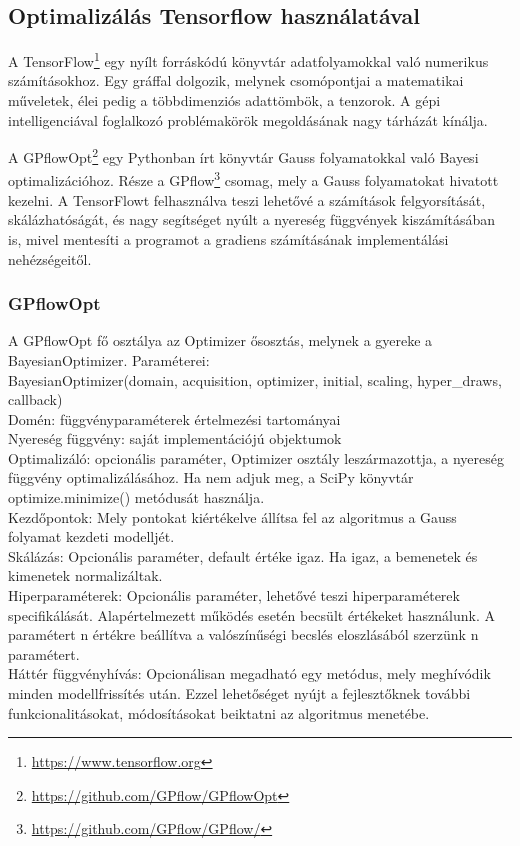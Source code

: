 \subsection{Optimalizálás Tensorflow használatával}
A TensorFlow\footnote{\url{https://www.tensorflow.org}} egy nyílt forráskódú könyvtár adatfolyamokkal való numerikus számításokhoz. Egy gráffal dolgozik, melynek csomópontjai a matematikai műveletek, élei pedig a többdimenziós adattömbök, a tenzorok. A gépi intelligenciával foglalkozó problémakörök megoldásának nagy tárházát kínálja.

A GPflowOpt\footnote{\url{https://github.com/GPflow/GPflowOpt}} egy Pythonban írt könyvtár Gauss folyamatokkal való Bayesi optimalizációhoz. Része a GPflow\footnote{\url{https://github.com/GPflow/GPflow/}} csomag, mely a Gauss folyamatokat hivatott kezelni. A TensorFlowt felhasználva teszi lehetővé a számítások felgyorsítását, skálázhatóságát, és nagy segítséget nyúlt a nyereség függvények kiszámításában is, mivel mentesíti a programot a gradiens számításának implementálási nehézségeitől.

\subsubsection{GPflowOpt}

A GPflowOpt fő osztálya az Optimizer ősosztás, melynek a gyereke a BayesianOptimizer. Paraméterei:\\
BayesianOptimizer(domain, acquisition, optimizer, initial, scaling, hyper\_draws, callback)\\
Domén: függvényparaméterek értelmezési tartományai\\
Nyereség függvény: saját implementációjú objektumok\\
Optimalizáló: opcionális paraméter, Optimizer osztály leszármazottja, a nyereség függvény optimalizálásához. Ha nem adjuk meg, a SciPy könyvtár optimize.minimize() metódusát használja.\\
Kezdőpontok: Mely pontokat kiértékelve állítsa fel az algoritmus a Gauss folyamat kezdeti modelljét.\\
Skálázás: Opcionális paraméter, default értéke igaz. Ha igaz, a bemenetek és kimenetek normalizáltak.\\
Hiperparaméterek: Opcionális paraméter, lehetővé teszi hiperparaméterek specifikálását. Alapértelmezett működés esetén becsült értékeket használunk. A paramétert n értékre beállítva a valószínűségi becslés eloszlásából %
szerzünk n paramétert.\\
Háttér függvényhívás: Opcionálisan megadható egy metódus, mely meghívódik minden modellfrissítés után. Ezzel lehetőséget nyújt a fejlesztőknek további funkcionalitásokat, módosításokat beiktatni az algoritmus menetébe.\\

